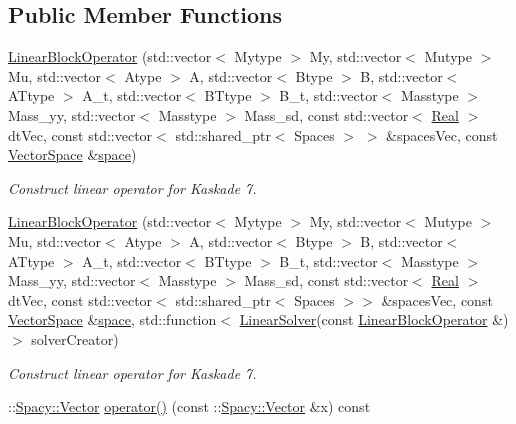 \subsection*{Public Member Functions}
\begin{DoxyCompactItemize}
\item 
\hyperlink{classSpacy_1_1KaskadeParabolic_1_1OCP_1_1LinearBlockOperator_a9d5566c5f2056687cf3626fe254cde81}{Linear\-Block\-Operator} (std\-::vector$<$ Mytype $>$ My, std\-::vector$<$ Mutype $>$ Mu, std\-::vector$<$ Atype $>$ A, std\-::vector$<$ Btype $>$ B, std\-::vector$<$ A\-Ttype $>$ A\-\_\-t, std\-::vector$<$ B\-Ttype $>$ B\-\_\-t, std\-::vector$<$ Masstype $>$ Mass\-\_\-yy, std\-::vector$<$ Masstype $>$ Mass\-\_\-sd, const std\-::vector$<$ \hyperlink{classSpacy_1_1Real}{Real} $>$ dt\-Vec, const std\-::vector$<$ std\-::shared\-\_\-ptr$<$ Spaces $>$ $>$ \&spaces\-Vec, const \hyperlink{classSpacy_1_1VectorSpace}{Vector\-Space} \&\hyperlink{classSpacy_1_1VectorBase_aa999dbf9d679d895dfe04c10fbf9f5e9}{space})
\begin{DoxyCompactList}\small\item\em Construct linear operator for Kaskade 7. \end{DoxyCompactList}\item 
\hyperlink{classSpacy_1_1KaskadeParabolic_1_1OCP_1_1LinearBlockOperator_a9d6f4d4d97f4d8ef2c38f69c2dfc56d4}{Linear\-Block\-Operator} (std\-::vector$<$ Mytype $>$ My, std\-::vector$<$ Mutype $>$ Mu, std\-::vector$<$ Atype $>$ A, std\-::vector$<$ Btype $>$ B, std\-::vector$<$ A\-Ttype $>$ A\-\_\-t, std\-::vector$<$ B\-Ttype $>$ B\-\_\-t, std\-::vector$<$ Masstype $>$ Mass\-\_\-yy, std\-::vector$<$ Masstype $>$ Mass\-\_\-sd, const std\-::vector$<$ \hyperlink{classSpacy_1_1Real}{Real} $>$ dt\-Vec, const std\-::vector$<$ std\-::shared\-\_\-ptr$<$ Spaces $>$$>$ \&spaces\-Vec, const \hyperlink{classSpacy_1_1VectorSpace}{Vector\-Space} \&\hyperlink{classSpacy_1_1VectorBase_aa999dbf9d679d895dfe04c10fbf9f5e9}{space}, std\-::function$<$ \hyperlink{namespaceSpacy_adcd0d78166a9c972b8a2e5a689fc2d03}{Linear\-Solver}(const \hyperlink{classSpacy_1_1KaskadeParabolic_1_1OCP_1_1LinearBlockOperator}{Linear\-Block\-Operator} \&)$>$ solver\-Creator)
\begin{DoxyCompactList}\small\item\em Construct linear operator for Kaskade 7. \end{DoxyCompactList}\item 
\-::\hyperlink{classSpacy_1_1Vector}{Spacy\-::\-Vector} \hyperlink{classSpacy_1_1KaskadeParabolic_1_1OCP_1_1LinearBlockOperator_af8753050294f4ee2862cea7b685b6537}{operator()} (const \-::\hyperlink{classSpacy_1_1Vector}{Spacy\-::\-Vector} \&x) const 
$$
\end{DoxyCompactItemize}
